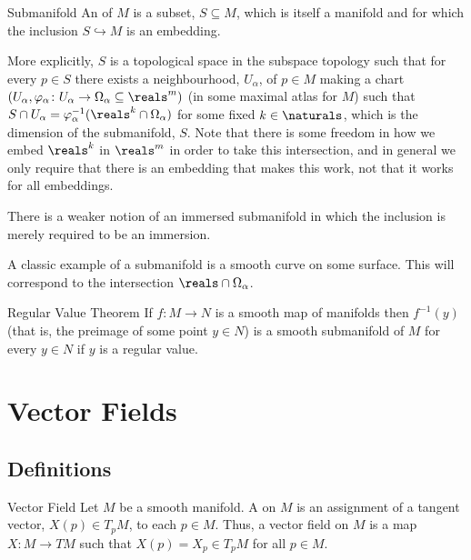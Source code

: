 \documentclass[fleqn]{NotesClass}
\begin{document}
    \begin{dfn}{Submanifold}{}
        An  of \(M\) is a subset, \(S \subseteq M\), which is itself a manifold and for which the inclusion \(S \hookrightarrow M\) is an embedding.
        
        More explicitly, \(S\) is a topological space in the subspace topology such that for every \(p \in S\) there exists a neighbourhood, \(U_\alpha\), of \(p \in M\) making a chart \((U_\alpha, \varphi_\alpha \colon U_\alpha \to \Omega_\alpha \subseteq \reals^m)\) (in some maximal atlas for \(M\)) such that \(S \cap U_\alpha = \varphi_\alpha^{-1}(\reals^k \cap \Omega_\alpha)\) for some fixed \(k \in \naturals\), which is the dimension of the submanifold, \(S\).
        Note that there is some freedom in how we embed \(\reals^k\) in \(\reals^m\) in order to take this intersection, and in general we only require that there is an embedding that makes this work, not that it works for all embeddings.
    \end{dfn}
    
    There is a weaker notion of an immersed submanifold in which the inclusion is merely required to be an immersion.
    
    A classic example of a submanifold is a smooth curve on some surface.
    This will correspond to the intersection \(\reals \cap \Omega_\alpha\).
    
    \begin{thm}{Regular Value Theorem}{}
        If \(f \colon M \to N\) is a smooth map of manifolds then \(f^{-1}(y)\) (that is, the preimage of some point \(y \in N\)) is a smooth submanifold of \(M\) for every \(y \in N\) if \(y\) is a regular value.
    \end{thm}
    
    \chapter{Vector Fields}
    \section{Definitions}
    \begin{dfn}{Vector Field}{}
        Let \(M\) be a smooth manifold.
        A  on \(M\) is an assignment of a tangent vector, \(X(p) \in T_pM\), to each \(p \in M\).
        Thus, a vector field on \(M\) is a map \(X \colon M \to TM\) such that \(X(p) = X_p \in T_pM\) for all \(p \in M\).
    \end{dfn}
    
\end{document}
